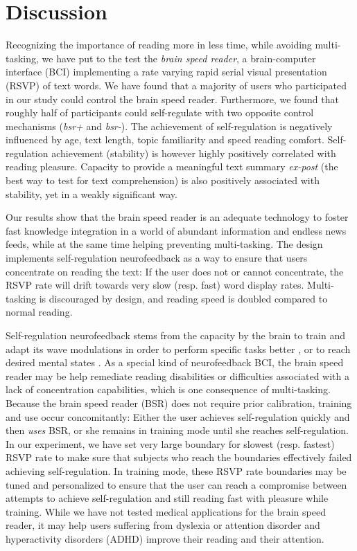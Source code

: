 \section{Discussion}
\label{discussion}
Recognizing the importance of reading more in less time, while avoiding multi-tasking, we have put to the test the {\it brain speed reader}, a brain-computer interface (BCI) implementing a rate varying rapid serial visual presentation (RSVP) of text words. We have found that a majority of users who participated in our study could control the brain speed reader. Furthermore, we found that roughly half of participants could self-regulate with two opposite control mechanisms ({\it bsr+} and {\it bsr-}). The achievement of self-regulation is negatively influenced by age, text length, topic familiarity and speed reading comfort. Self-regulation achievement (stability) is however highly positively correlated with reading pleasure. Capacity to provide a meaningful text summary {\it ex-post} (the best way to test for text comprehension) is also positively associated with stability, yet in a weakly significant way.

Our results show that the brain speed reader is an adequate technology to foster fast knowledge integration in a world of abundant information and endless news feeds, while at the same time helping preventing multi-tasking. The design implements self-regulation neurofeedback as a way to ensure that users concentrate on reading the text: If the user does not or cannot concentrate, the RSVP rate will drift towards very slow (resp. fast) word display rates. Multi-tasking is discouraged by design, and reading speed is doubled compared to normal reading.

Self-regulation neurofeedback stems from the capacity by the brain to train and adapt its wave modulations in order to perform specific tasks better \cite{piano_neurofeedback}, or to reach desired mental states \cite{neurofeedback_meditation}.  As a special kind of neurofeedback BCI, the brain speed reader may be help remediate reading disabilities or difficulties associated with a lack of concentration capabilities, which is one consequence of multi-tasking. Because the brain speed reader (BSR) does not require prior calibration, training and use occur concomitantly: Either the user achieves self-regulation quickly and then {\it uses} BSR, or she remains in training mode until she reaches self-regulation. In our experiment, we have set very large boundary for slowest (resp. fastest) RSVP rate to make sure that subjects who reach the boundaries effectively failed achieving self-regulation. In training mode, these RSVP rate boundaries may be tuned and personalized to ensure that the user can reach a compromise between attempts to achieve self-regulation and still reading fast with pleasure while training. While we have not tested medical applications for the brain speed reader, it may help users suffering from dyslexia or attention disorder and hyperactivity disorders (ADHD) improve their reading and their attention.

